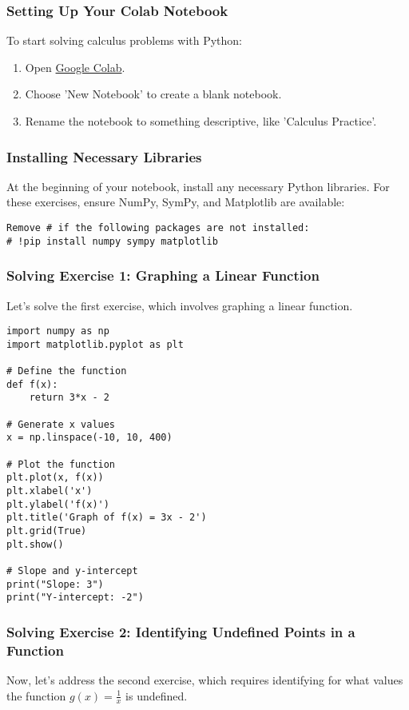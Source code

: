 \documentclass[a4paper,12pt]{book}
\newcounter{problem}
\begin{document}
\subsubsection*{Setting Up Your Colab Notebook}
To start solving calculus problems with Python:

\begin{enumerate}
    \item Open \href{https://colab.research.google.com/}{Google Colab}.
    \item Choose 'New Notebook' to create a blank notebook.
    \item Rename the notebook to something descriptive, like 'Calculus Practice'.
\end{enumerate}

\subsubsection*{Installing Necessary Libraries}
At the beginning of your notebook, install any necessary Python libraries. For these exercises, ensure NumPy, SymPy, and Matplotlib are available:

\begin{verbatim}
Remove # if the following packages are not installed:
# !pip install numpy sympy matplotlib
\end{verbatim}

\subsubsection*{Solving Exercise 1: Graphing a Linear Function}
Let's solve the first exercise, which involves graphing a linear function.

\begin{verbatim}
import numpy as np
import matplotlib.pyplot as plt

# Define the function
def f(x):
    return 3*x - 2

# Generate x values
x = np.linspace(-10, 10, 400)

# Plot the function
plt.plot(x, f(x))
plt.xlabel('x')
plt.ylabel('f(x)')
plt.title('Graph of f(x) = 3x - 2')
plt.grid(True)
plt.show()

# Slope and y-intercept
print("Slope: 3")
print("Y-intercept: -2")
\end{verbatim}

\subsubsection*{Solving Exercise 2: Identifying Undefined Points in a Function}
Now, let's address the second exercise, which requires identifying for what values the function \( g(x) = \frac{1}{x} \) is undefined.
\end{document}
